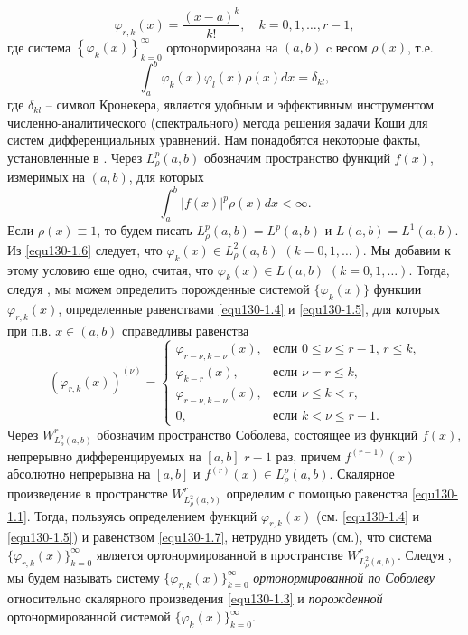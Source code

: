   \begin{equation}\label{equ130-1.5}
\varphi_{r,k}(x) =\frac{(x-a)^k}{k!}, \quad k=0,1,\ldots, r-1,
\end{equation}
где система $\left\{\varphi_k(x)\right\}_{k=0}^\infty$ ортонормирована  на $(a,b)$  c весом   $\rho(x)$, т.е.
 \begin{equation}\label{equ130-1.6}
\int_a^b\varphi_k(x)\varphi_l(x)\rho(x)dx=\delta_{kl},
\end{equation}
где $\delta_{kl}$ -- символ Кронекера, является удобным и эффективным инструментом  численно-аналитического (спектрального) метода решения задачи Коши для систем дифференциальных уравнений.   Нам понадобятся некоторые факты, установленные в \cite{equ130-Shar20}.
  Через $L^p_\rho(a,b)$ обозначим пространство  функций $f(x)$, измеримых  на  $(a,b)$, для которых
 \begin{equation*}
\int_a^b|f(x)|^p\rho(x)dx<\infty.
\end{equation*}
Если $\rho(x)\equiv1$, то будем писать $L^p_\rho(a,b)=L^p(a,b)$ и $L(a,b)=L^1(a,b)$.
Из \eqref{equ130-1.6} следует, что $\varphi_k(x)\in L^2_\rho(a,b)$ $(k=0,1,\ldots)$. Мы добавим к этому условию еще одно, считая, что $\varphi_k(x)\in L(a,b)$ $(k=0,1,\ldots)$. Тогда, следуя  \cite{equ130-Shar20}, мы можем определить  порожденные системой $\{\varphi_k(x)\}$ функции $\varphi_{r,k}(x)$, определенные равенствами \eqref{equ130-1.4} и \eqref{equ130-1.5}, для которых при п.в. $x\in (a,b)$ справедливы равенства
 \begin{equation}\label{equ130-1.7}
(\varphi_{r,k}(x))^{(\nu)} =\begin{cases}\varphi_{r-\nu,k-\nu}(x),&\text{если $0\le\nu\le r-1$, $r\le k$,}\\
\varphi_{k-r}(x),&\text{если  $\nu=r\le k$,}\\
\varphi_{r-\nu,k-\nu}(x),&\text{если $\nu\le k< r$,}\\
0,&\text{если $k< \nu\le r-1$}.
  \end{cases}
\end{equation}
Через $W^r_{L^p_\rho(a,b)}$ обозначим пространство Соболева, состоящее из функций $f(x)$, непрерывно дифференцируемых на $[a,b]$ $r-1$ раз, причем $f^{(r-1)}(x)$ абсолютно непрерывна на $[a,b]$  и $f^{(r)}(x)\in L^p_\rho(a,b)$.
Скалярное произведение в пространстве $W^r_{L^2_\rho(a,b)}$ определим с помощью равенства \eqref{equ130-1.1}. Тогда, пользуясь определением функций  $\varphi_{r,k}(x)$ (см. \eqref{equ130-1.4} и \eqref{equ130-1.5}) и равенством  \eqref{equ130-1.7}, нетрудно увидеть (см.\cite{equ130-Shar20}),  что система $\{\varphi_{r,k}(x)\}_{k=0}^\infty$ является ортонормированной в пространстве $W^r_{L^2_\rho(a,b)}$. Следуя \cite{equ130-Shar20}, мы будем называть систему $\{\varphi_{r,k}(x)\}_{k=0}^\infty$ \textit{ ортонормированной по Соболеву } относительно скалярного произведения \eqref{equ130-1.3} и  \textit{ порожденной} ортонормированной системой $\{\varphi_{k}(x)\}_{k=0}^\infty$.
